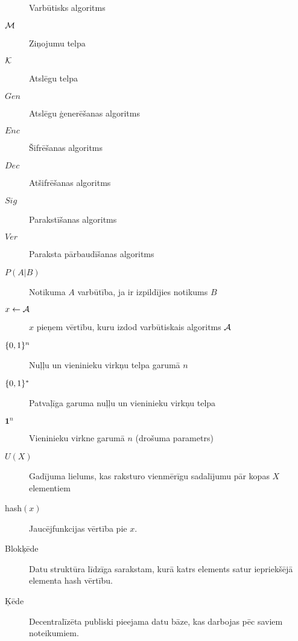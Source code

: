\begin{description}
    \item[\ppt] Varbūtisks algoritms
    \item[$\mathcal{M}$]Ziņojumu telpa
    \item[$\mathcal{K}$]Atslēgu telpa
    \item[$Gen$]Atslēgu ģenerēšanas algoritms
    \item[$Enc$]Šifrēšanas algoritms
    \item[$Dec$]Atšifrēšanas algoritms
    \item[$Sig$]Parakstīšanas algoritms
    \item[$Ver$]Paraksta pārbaudīšanas algoritms
    \item[$P(A|B)$]Notikuma $A$ varbūtība, ja ir izpildījies notikums $B$
    \item[$x \leftarrow \mathcal{A}$]$x$ pieņem vērtību, kuru izdod varbūtiskais algoritms $\mathcal{A}$
    \item[$\{0,1\}^n$] Nuļļu un vieninieku virkņu telpa garumā $n$ 
    \item[$\{0,1\}^*$]Patvaļīga garuma nuļļu un vieninieku virkņu telpa
    \item[$\mathbf{1}^n$]Vieninieku virkne garumā $n$ (drošuma parametrs)
    \item[$U(X)$] Gadījuma lielums, kas raksturo vienmērīgu sadalījumu pār kopas $X$ elementiem
    \item[hash$(x)$] Jaucējfunkcijas vērtība pie $x$.
    \item[Blokķēde] Datu struktūra līdzīga sarakstam, kurā katrs elements satur iepriekšējā elementa hash vērtību.
    \item[Ķēde] Decentralīzēta publiski pieejama datu bāze, kas darbojas pēc saviem noteikumiem.
\end{description}
